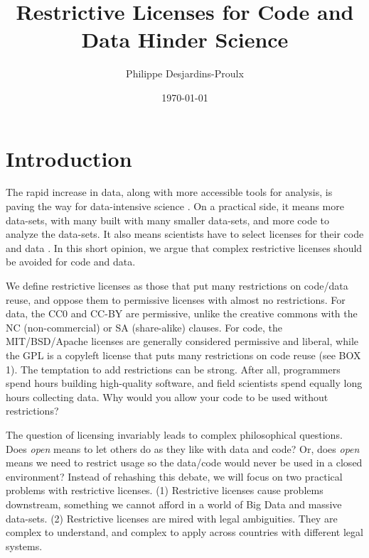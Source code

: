 \documentclass[letterpaper]{article}
\begin{document}
\title{Restrictive Licenses for Code and Data Hinder Science}
\author[0,1,2]{Philippe Desjardins-Proulx}
\date{\today}
\maketitle

\section{Introduction}

The rapid increase in data, along with more accessible tools for analysis, is
paving the way for data-intensive science \cite{hey09}. On a practical side, it
means more data-sets, with many built with many smaller data-sets, and more
code to analyze the data-sets. It also means scientists have to select
licenses for their code and data \cite{mor12}. In this short opinion, we
argue that complex restrictive licenses should be avoided for code and data.

We define restrictive licenses as those that put many restrictions on code/data
reuse, and oppose them to permissive licenses with almost no restrictions. For
data, the CC0 and CC-BY are permissive, unlike the creative commons with the NC
(non-commercial) or SA (share-alike) clauses. For code, the MIT/BSD/Apache
licenses are generally considered permissive and liberal, while the GPL is a
copyleft license that puts many restrictions on code reuse (see BOX 1). The
temptation to add restrictions can be strong. After all, programmers spend
hours building high-quality software, and field scientists spend equally long
hours collecting data. Why would you allow your code to be used without
restrictions?

The question of licensing invariably leads to complex philosophical questions.
Does \emph{open} means to let others do as they like with data and code? Or,
does \emph{open} means we need to restrict usage so the data/code would never
be used in a closed environment? Instead of rehashing this debate, we will
focus on two practical problems with restrictive licenses. (1) Restrictive
licenses cause problems downstream, something we cannot afford in a world of
Big Data and massive data-sets. (2) Restrictive licenses are mired with legal
ambiguities. They are complex to understand, and complex to apply across
countries with different legal systems.
\end{document}
